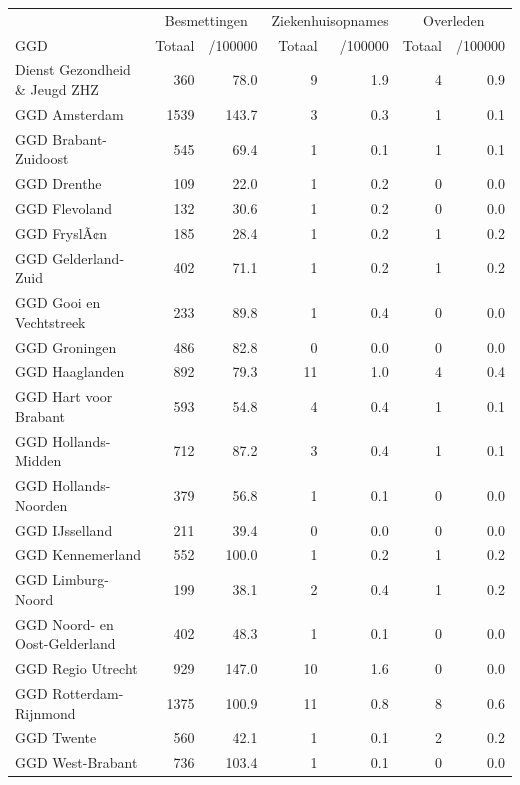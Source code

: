\documentclass[
  english,
  man,floatsintext]{apa6}
\begin{document}
\begin{table}
\centering\begingroup\fontsize{10}{12}\selectfont

\begin{threeparttable}
\begin{tabular}{lrrrrrr}
\toprule
\multicolumn{1}{c}{ } & \multicolumn{2}{c}{Besmettingen} & \multicolumn{2}{c}{Ziekenhuisopnames} & \multicolumn{2}{c}{Overleden} \\
\cmidrule(l{3pt}r{3pt}){2-3} \cmidrule(l{3pt}r{3pt}){4-5} \cmidrule(l{3pt}r{3pt}){6-7}
GGD & Totaal & /100000 & Totaal & /100000 & Totaal & /100000\\
\midrule
Dienst Gezondheid \& Jeugd ZHZ & 360 & 78.0 & 9 & 1.9 & 4 & 0.9\\
GGD Amsterdam & 1539 & 143.7 & 3 & 0.3 & 1 & 0.1\\
GGD Brabant-Zuidoost & 545 & 69.4 & 1 & 0.1 & 1 & 0.1\\
GGD Drenthe & 109 & 22.0 & 1 & 0.2 & 0 & 0.0\\
GGD Flevoland & 132 & 30.6 & 1 & 0.2 & 0 & 0.0\\
GGD FryslÃ¢n & 185 & 28.4 & 1 & 0.2 & 1 & 0.2\\
GGD Gelderland-Zuid & 402 & 71.1 & 1 & 0.2 & 1 & 0.2\\
GGD Gooi en Vechtstreek & 233 & 89.8 & 1 & 0.4 & 0 & 0.0\\
GGD Groningen & 486 & 82.8 & 0 & 0.0 & 0 & 0.0\\
GGD Haaglanden & 892 & 79.3 & 11 & 1.0 & 4 & 0.4\\
GGD Hart voor Brabant & 593 & 54.8 & 4 & 0.4 & 1 & 0.1\\
GGD Hollands-Midden & 712 & 87.2 & 3 & 0.4 & 1 & 0.1\\
GGD Hollands-Noorden & 379 & 56.8 & 1 & 0.1 & 0 & 0.0\\
GGD IJsselland & 211 & 39.4 & 0 & 0.0 & 0 & 0.0\\
GGD Kennemerland & 552 & 100.0 & 1 & 0.2 & 1 & 0.2\\
GGD Limburg-Noord & 199 & 38.1 & 2 & 0.4 & 1 & 0.2\\
GGD Noord- en Oost-Gelderland & 402 & 48.3 & 1 & 0.1 & 0 & 0.0\\
GGD Regio Utrecht & 929 & 147.0 & 10 & 1.6 & 0 & 0.0\\
GGD Rotterdam-Rijnmond & 1375 & 100.9 & 11 & 0.8 & 8 & 0.6\\
GGD Twente & 560 & 42.1 & 1 & 0.1 & 2 & 0.2\\
GGD West-Brabant & 736 & 103.4 & 1 & 0.1 & 0 & 0.0\\

\end{tabular}
\end{threeparttable}
\end{table}
\end{document}
